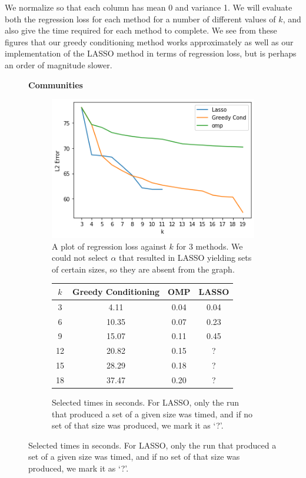 \documentclass{amsart}
\theoremstyle{definition}
\begin{document}
We normalize so that each column has mean 0 and variance 1.
We will evaluate both the regression loss for each method for a number of different values of $k$, and also give the time required for each method to complete.
We see from these figures that our greedy conditioning method works approximately as well as our implementation of the LASSO method in terms of regression loss, but is perhaps an order of magnitude slower.

\begin{figure}[H]
    \centering
    \textbf{Communities}\par\medskip
    \begin{subfigure}[b]{0.4\textwidth}
        \includegraphics[width=\textwidth]{violentcrime.png}
        \caption{A plot of regression loss against $k$ for 3 methods. We could not select $\alpha$ that resulted in LASSO yielding sets of certain sizes, so they are absent from the graph.}
    \end{subfigure}
    \begin{subfigure}[b]{0.4\textwidth}
        \begin{tabular}{c c c c}
            $k$ & Greedy Conditioning & OMP & LASSO \\
            \hline
            3 & 4.11 & 0.04 & 0.04\\
            6 & 10.35 & 0.07 & 0.23\\
            9 & 15.07 & 0.11 & 0.45\\
            12 & 20.82 & 0.15 & ?\\
            15 & 28.29 & 0.18 & ?\\
            18 & 37.47 & 0.20 & ?\\
        \end{tabular}
        \vspace{0.5in}
        \caption{Selected times in seconds. For LASSO, only the run that produced a set of a given size was timed, and if no set of that size was produced, we mark it as `?'.}
    \end{subfigure}
\end{figure}
\end{document}
